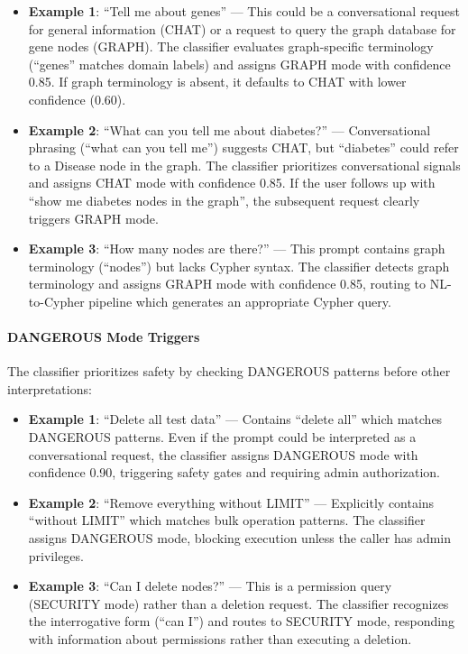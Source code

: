 \documentclass[a4paper,twoside]{sapthesis}
\begin{document}
\begin{itemize}
    \item \textbf{Example 1}: ``Tell me about genes'' --- This could be a conversational request for general information (CHAT) or a request to query the graph database for gene nodes (GRAPH). The classifier evaluates graph-specific terminology (``genes'' matches domain labels) and assigns GRAPH mode with confidence 0.85. If graph terminology is absent, it defaults to CHAT with lower confidence (0.60).
    
    \item \textbf{Example 2}: ``What can you tell me about diabetes?'' --- Conversational phrasing (``what can you tell me'') suggests CHAT, but ``diabetes'' could refer to a Disease node in the graph. The classifier prioritizes conversational signals and assigns CHAT mode with confidence 0.85. If the user follows up with ``show me diabetes nodes in the graph'', the subsequent request clearly triggers GRAPH mode.
    
    \item \textbf{Example 3}: ``How many nodes are there?'' --- This prompt contains graph terminology (``nodes'') but lacks Cypher syntax. The classifier detects graph terminology and assigns GRAPH mode with confidence 0.85, routing to NL-to-Cypher pipeline which generates an appropriate Cypher query.
\end{itemize}

\paragraph{DANGEROUS Mode Triggers}

The classifier prioritizes safety by checking DANGEROUS patterns before other interpretations:

\begin{itemize}
    \item \textbf{Example 1}: ``Delete all test data'' --- Contains ``delete all'' which matches DANGEROUS patterns. Even if the prompt could be interpreted as a conversational request, the classifier assigns DANGEROUS mode with confidence 0.90, triggering safety gates and requiring admin authorization.
    
    \item \textbf{Example 2}: ``Remove everything without LIMIT'' --- Explicitly contains ``without LIMIT'' which matches bulk operation patterns. The classifier assigns DANGEROUS mode, blocking execution unless the caller has admin privileges.
    
    \item \textbf{Example 3}: ``Can I delete nodes?'' --- This is a permission query (SECURITY mode) rather than a deletion request. The classifier recognizes the interrogative form (``can I'') and routes to SECURITY mode, responding with information about permissions rather than executing a deletion.
\end{itemize}
\end{document}
